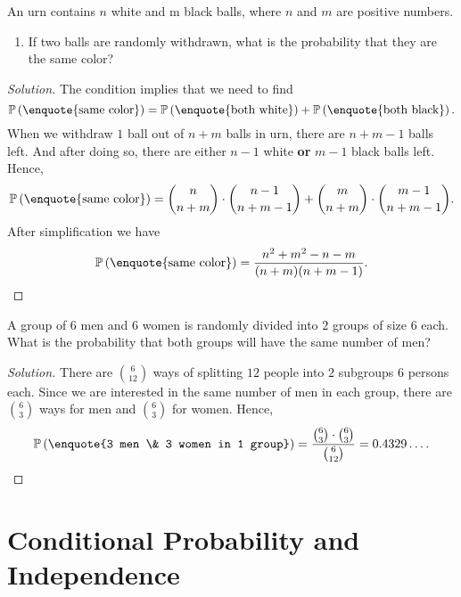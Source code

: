 \documentclass{article}[12pt]
\newenvironment{solution}
  {\renewcommand\qedsymbol{$\blacksquare$}\begin{proof}[Solution]}
  {\end{proof}}
\newenvironment{problem}[1]
  {\renewcommand\theinnercustomprblm{#1}\innercustomprblm}
  {\endinnercustomprblm}
\renewcommand{\P}{\mathbb{P}}
\begin{document}
\begin{problem}{29a}\normalfont
An urn contains $n$ white and m black balls, where $n$ and $m$ are positive numbers.
\begin{enumerate}[label=(\alph*)]
    \item If two balls are randomly withdrawn, what is the probability that they are the same color?
\end{enumerate}
\end{problem}
\begin{solution}
The condition implies that we need to find
\begin{equation*}
    \P\left(\text{\enquote{same color}}\right) = \P\left(\text{\enquote{both white}}\right) + \P\left(\text{\enquote{both black}}\right).
\end{equation*}
When we withdraw $1$ ball out of $n + m$ balls in urn, there are $n + m - 1$ balls left.
And after doing so, there are either $n - 1$ white \textbf{or} $m - 1$ black balls left.
Hence,
\begin{equation*}
    \P\left(\text{\enquote{same color}}\right) = \binom{n}{n+m}\cdot\binom{n-1}{n+m-1} + \binom{m}{n+m}\cdot\binom{m-1}{n+m-1}.
\end{equation*}
After simplification we have
\begin{equation*}
    \P\left(\text{\enquote{same color}}\right) = \dfrac{n^{2} + m^{2} - n - m}{(n + m)(n + m -1)}.
\end{equation*}
\end{solution}

\begin{problem}{49}\normalfont
A group of $6$ men and $6$ women is randomly divided into $2$ groups of size $6$ each.
What is the probability that both groups will have the same number of men?
\end{problem}
\begin{solution}
There are $\binom{6}{12}$ ways of splitting $12$ people into $2$ subgroups $6$ persons each.
Since we are interested in the same number of men in each group, there are $\binom{6}{3}$ ways for men and $\binom{6}{3}$ for women.
Hence,
\begin{equation*}
    \P\left(\text{\enquote{3 men \& 3 women in 1 group}}\right) = \dfrac{\binom{6}{3}\cdot\binom{6}{3}}{\binom{6}{12}} = 0.4329\ldots.
\end{equation*}

\end{solution}

\section{Conditional Probability and Independence}
\end{document}
